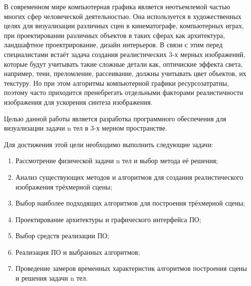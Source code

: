 
В современном мире компьютерная графика является неотъемлемой частью многих сфер человеческой деятельностью. Она используется в художественных целях для визуализации различных сцен в кинематографе, компьютерных играх, при проектировании различных объектов в таких сферах как архитектура, ландшафтное проектрирование, дизайн интерьеров. В связи с этим перед специалистами встаёт задача создания реалистических 3-х мерных изображений, которые будут учитывать такие сложные детали как, оптичиские эффекта света, например, тени, преломление, рассеивание, должны учитывать цвет объектов, их текстуру. Но при этом алгоритмы компьютерной графики ресурсозатратны, поэтому часто приходится пренебрегать отдельными факторами реалистичности изображения для ускорения синтеза изображения.

Целью данной работы является разработка программного обеспечения для визуализации задачи n тел в 3-х мерном пространстве.

Для достижения этой цели необходимо выполнить следующие задачи:

\begin{enumerate}
	\item Рассмотрение физической задачи n тел и выбор метода её решения;
	\item Анализ существующих методов и алгоритмов для создания реалистического изображения трёхмерной сцены;
	\item Выбор наиболее подходящих алгоритмов для построения трёхмерной сцены;
	\item Проектирование архитектуры и графического интерфейса ПО;
	\item Выбор средств реализации ПО;
	\item Реализация ПО и выбранных алгоритмов;
	\item Проведение замеров временных характеристик алгоритмов построения сцены и решения задачи n тел.
\end{enumerate}

\clearpage
